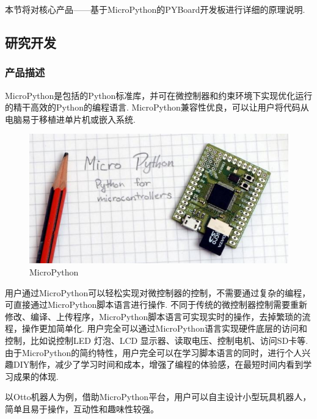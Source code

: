 本节将对核心产品——基于MicroPython的PYBoard开发板进行详细的原理说明.
\subsection{研究开发}
\subsubsection{产品描述}
MicroPython是包括的Python标准库，并可在微控制器和约束环境下实现优化运行的精干高效的Python的编程语言.
MicroPython兼容性优良，可以让用户将代码从电脑易于移植进单片机或嵌入系统.

\begin{figure}[H]
\centering
\includegraphics[width=12cm]{3.0.jpg}
\caption{MicroPython}
\label{MicroPython}
\end{figure}

用户通过MicroPython可以轻松实现对微控制器的控制，不需要通过复杂的编程，可直接通过MicroPython脚本语言进行操作.
不同于传统的微控制器控制需要重新修改、编译、上传程序，MicroPython脚本语言可实现实时的操作，去掉繁琐的流程，操作更加简单化.
用户完全可以通过MicroPython语言实现硬件底层的访问和控制，比如说控制LED 灯泡、LCD 显示器、读取电压、控制电机、访问SD卡等.
由于MicroPython的简约特性，用户完全可以在学习脚本语言的同时，进行个人兴趣DIY制作，减少了学习时间和成本，增强了编程的体验感，在最短时间内看到学习成果的体现.

以Otto机器人为例，借助MicroPython平台，用户可以自主设计小型玩具机器人，简单且易于操作，互动性和趣味性较强。

